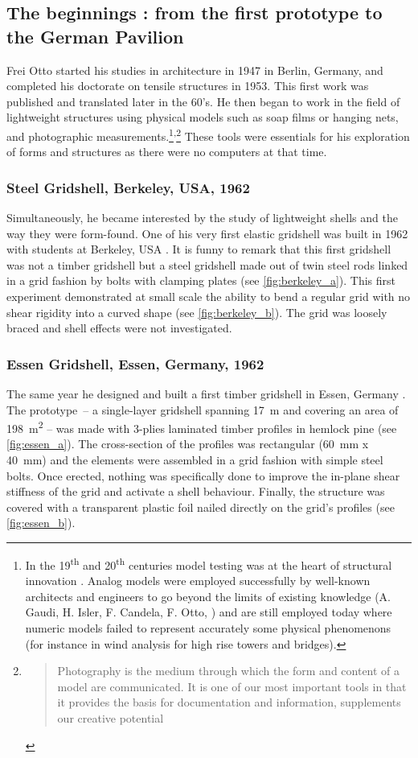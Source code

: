 \subsection{The beginnings : from the first prototype to the German Pavilion}
Frei Otto started his studies in architecture in 1947 in Berlin, Germany, and completed his doctorate on tensile structures in 1953. This first work was published and translated later in the 60's. He then began to work in the field of lightweight structures using physical models such as soap films or hanging nets, and photographic measurements.\footnote{In the 19\textsuperscript{th} and 20\textsuperscript{th} centuries model testing was at the heart of structural innovation \cite{Addis2013}. Analog models were employed successfully by well-known architects and engineers to go beyond the limits of existing knowledge (A. Gaudi, H. Isler, F. Candela, F. Otto, \telp{}) and are still employed today where numeric models failed to represent accurately some physical phenomenons (for instance in wind analysis for high rise towers and bridges).}\textsuperscript{,}\footnote{\blockcquote[p.~56]{IL10}{Photography is the medium through which the form and content of a model are communicated. It is one of our most important tools in that it provides the basis for documentation and information, supplements our creative potential \belp{} }} These tools were essentials for his exploration of forms and structures as there were no computers at that time.

\subsubsection{Steel Gridshell, Berkeley, USA, 1962}
Simultaneously, he became interested by the study of lightweight shells and the way they were form-found. One of his very first elastic gridshell was built in 1962 with students at Berkeley, USA \cite[p.~270]{IL10}. It is funny to remark that this first gridshell was not a timber gridshell but a steel gridshell made out of twin steel rods linked in a grid fashion by bolts with clamping plates (see \cref{fig:berkeley_a}). This first experiment demonstrated at small scale the ability to bend a regular grid with no shear rigidity into a curved shape  (see \cref{fig:berkeley_b}). The grid was loosely braced and shell effects were not investigated.

\subsubsection{Essen Gridshell, Essen, Germany, 1962}
The same year he designed and built a first timber gridshell in Essen, Germany \cite[p.~272]{IL10}. The prototype~-- a single-layer gridshell spanning \SI{17}{m} and covering an area of \SI{198}{m^2} -- was made with 3-plies laminated timber profiles in hemlock pine (see \cref{fig:essen_a}). The cross-section of the profiles was rectangular (\SI{60}{mm} x \SI{40}{mm}) and the elements were assembled in a grid fashion with simple steel bolts. Once erected, nothing was specifically done to improve the in-plane shear stiffness of the grid and activate a shell behaviour. Finally, the structure was covered with a transparent plastic foil nailed directly on the grid's profiles (see \cref{fig:essen_b}).


